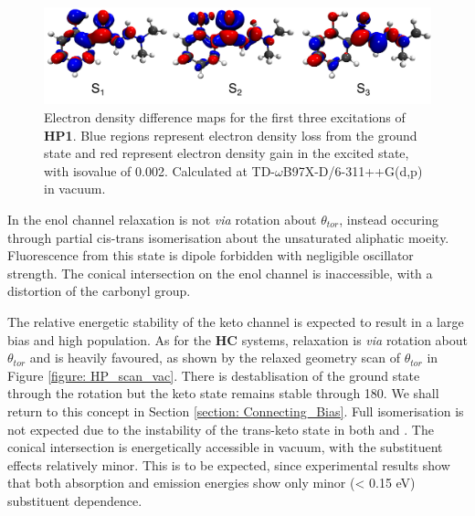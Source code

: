 \begin{figure}[H]
\centering
  \includegraphics[width=0.9\linewidth]{5ConnectingCrystalStructure/monomer_excitations.pdf}
  \caption[Electron density difference maps for the first three excitations of \textbf{HP1}.]{Electron density difference maps for the first three excitations of \textbf{HP1}. Blue regions represent electron density loss from the ground state and red represent electron density gain in the excited state, with isovalue of 0.002. Calculated at TD-$\omega$B97X-D/6-311++G(d,p) in vacuum.}
  \label{figure: monomer_excitations}
\end{figure}
In the enol channel relaxation is not \textit{via} rotation about $\theta_{tor}$, instead occuring through partial cis-trans isomerisation about the unsaturated aliphatic moeity. Fluorescence from this state is dipole forbidden with negligible oscillator strength. The conical intersection on the enol channel is inaccessible, with a distortion of the carbonyl group.

The relative energetic stability of the keto channel is expected to result in a large bias and high population. As for the \textbf{HC} systems, relaxation is \textit{via} rotation about $\theta_{tor}$ and is heavily favoured, as shown by the relaxed geometry scan of $\theta_{tor}$ in Figure \ref{figure: HP_scan_vac}. There is destablisation of the ground state through the rotation but the keto state remains stable through 180\degree{}. We shall return to this concept in Section \ref{section: Connecting_Bias}. Full isomerisation is not expected due to the instability of the trans-keto state in both \sone{} and \szero{}. The conical intersection is energetically accessible in vacuum, with the substituent effects relatively minor. This is to be expected, since experimental results show that both absorption and emission energies show only minor (\textless{} 0.15 eV) substituent dependence. 

